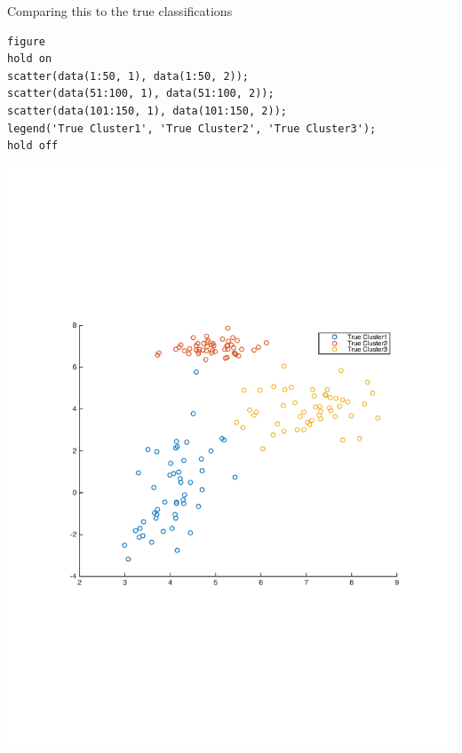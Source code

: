 \documentclass[11pt]{article}
\begin{document}
    
    Comparing this to the true classifications
    \begin{lstlisting}
figure
hold on
scatter(data(1:50, 1), data(1:50, 2));
scatter(data(51:100, 1), data(51:100, 2));
scatter(data(101:150, 1), data(101:150, 2));
legend('True Cluster1', 'True Cluster2', 'True Cluster3');
hold off\end{lstlisting}
    
    \begin{center}
    \includegraphics[width=\linewidth]{2-2}
    \end{center}
    
\end{document}
